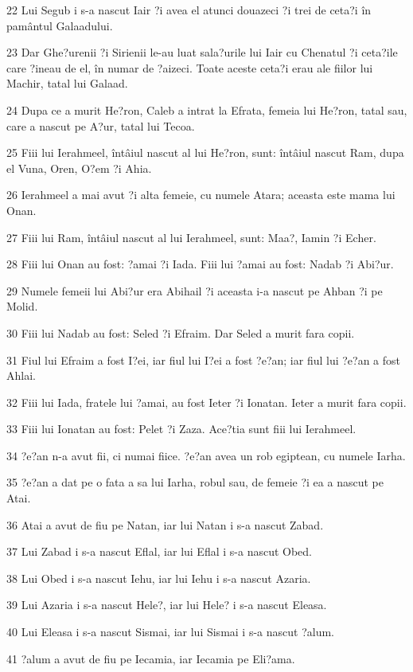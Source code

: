\par 22 Lui Segub i s-a nascut Iair ?i avea el atunci douazeci ?i trei de ceta?i în pamântul Galaadului.
\par 23 Dar Ghe?urenii ?i Sirienii le-au luat sala?urile lui Iair cu Chenatul ?i ceta?ile care ?ineau de el, în numar de ?aizeci. Toate aceste ceta?i erau ale fiilor lui Machir, tatal lui Galaad.
\par 24 Dupa ce a murit He?ron, Caleb a intrat la Efrata, femeia lui He?ron, tatal sau, care a nascut pe A?ur, tatal lui Tecoa.
\par 25 Fiii lui Ierahmeel, întâiul nascut al lui He?ron, sunt: întâiul nascut Ram, dupa el Vuna, Oren, O?em ?i Ahia.
\par 26 Ierahmeel a mai avut ?i alta femeie, cu numele Atara; aceasta este mama lui Onan.
\par 27 Fiii lui Ram, întâiul nascut al lui Ierahmeel, sunt: Maa?, Iamin ?i Echer.
\par 28 Fiii lui Onan au fost: ?amai ?i Iada. Fiii lui ?amai au fost: Nadab ?i Abi?ur.
\par 29 Numele femeii lui Abi?ur era Abihail ?i aceasta i-a nascut pe Ahban ?i pe Molid.
\par 30 Fiii lui Nadab au fost: Seled ?i Efraim. Dar Seled a murit fara copii.
\par 31 Fiul lui Efraim a fost I?ei, iar fiul lui I?ei a fost ?e?an; iar fiul lui ?e?an a fost Ahlai.
\par 32 Fiii lui Iada, fratele lui ?amai, au fost Ieter ?i Ionatan. Ieter a murit fara copii.
\par 33 Fiii lui Ionatan au fost: Pelet ?i Zaza. Ace?tia sunt fiii lui Ierahmeel.
\par 34 ?e?an n-a avut fii, ci numai fiice. ?e?an avea un rob egiptean, cu numele Iarha.
\par 35 ?e?an a dat pe o fata a sa lui Iarha, robul sau, de femeie ?i ea a nascut pe Atai.
\par 36 Atai a avut de fiu pe Natan, iar lui Natan i s-a nascut Zabad.
\par 37 Lui Zabad i s-a nascut Eflal, iar lui Eflal i s-a nascut Obed.
\par 38 Lui Obed i s-a nascut Iehu, iar lui Iehu i s-a nascut Azaria.
\par 39 Lui Azaria i s-a nascut Hele?, iar lui Hele? i s-a nascut Eleasa.
\par 40 Lui Eleasa i s-a nascut Sismai, iar lui Sismai i s-a nascut ?alum.
\par 41 ?alum a avut de fiu pe Iecamia, iar Iecamia pe Eli?ama.
